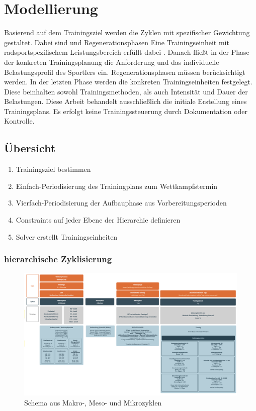 \chapter{Modellierung}
\label{sec:modellierung}
Basierend auf dem Trainingsziel werden die Zyklen mit spezifischer Gewichtung gestaltet. Dabei sind  und Regenerationsphasen Eine Trainingseinheit mit radsportspezifischem Leistungsbereich erfüllt dabei .
Danach fließt in der Phase der konkreten Trainingsplanung die Anforderung und das individuelle Belastungsprofil des Sportlers ein. Regenerationsphasen müssen berücksichtigt werden. 
In der letzten Phase werden die konkreten Trainingseinheiten festgelegt. Diese beinhalten sowohl Trainingsmethoden, als auch Intensität und Dauer der Belastungen. 
Diese Arbeit behandelt ausschließlich die initiale Erstellung eines Trainingsplans. Es erfolgt keine Trainingssteuerung durch Dokumentation oder Kontrolle.
\section{Übersicht}
\label{sec:modellierung:uebersicht}
    \begin{enumerate}
        \item Trainingsziel bestimmen
        \item Einfach-Periodisierung des Trainingplans zum Wettkampfstermin
        \item Vierfach-Periodisierung der Aufbauphase aus Vorbereitungsperioden
        \item Constraints auf jeder Ebene der Hierarchie definieren 
        \item Solver erstellt Trainingseinheiten
    \end{enumerate}
    \subsection{hierarchische Zyklisierung}
    \begin{figure}[htb]
    	\includegraphics[width=\textwidth]{gfx/modell.png}
    	\caption{Schema aus Makro-, Meso- und Mikrozyklen}
    	\label{fig:modellierung:schema}
    \end{figure}


